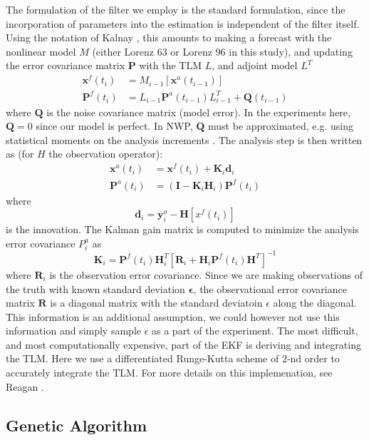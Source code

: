 \documentclass[onecolumn]{article}
\begin{document}
\begin{multicols}{2}
The formulation of the filter we employ is the standard formulation, since the incorporation of parameters into the estimation is independent of the filter itself.
Using the notation of Kalnay \cite{kalnay2003}, this amounts to making a forecast with the nonlinear model $M$ (either Lorenz 63 or Lorenz 96 in this study), and updating the error covariance matrix $\mathbf{P}$ with the TLM $L$, and adjoint model $L^T$
\begin{align*} \mathbf{x}^f (t_i) &= M _{i-1} [\mathbf{x} ^a (t_{i-1} ) ]\\
\mathbf{P}^f (t_i ) &= L_{i-1} \mathbf{P}^a (t_{i-1} ) L^T _{i-1} + \mathbf{Q} (t_{i-1} ) \end{align*}
where $\mathbf{Q}$ is the noise covariance matrix (model error).
In the experiments here, $\mathbf{Q} = 0$ since our model is perfect.
In NWP, $\mathbf{Q}$ must be approximated, e.g. using statistical moments on the analysis increments \cite{danforth2007estimating,li2009accounting}.
The analysis step is then written as (for $H$ the observation operator):
\begin{align} \mathbf{x}^a (t_i ) &= \mathbf{x}^f (t_i) + \mathbf{K}_i \mathbf{d}_i\\
\mathbf{P}^a (t_i) &= (\mathbf{I} - \mathbf{K}_i \mathbf{H}_i )\mathbf{P}^f (t_i) \end{align}
where
\[ \mathbf{d}_i = \mathbf{y}_i^o - \mathbf{H}[x^f (t_i) ] \]
is the innovation. The Kalman gain matrix is computed to minimize the analysis error covariance $P^a _i$ as
\[ \mathbf{K}_i = \mathbf{P}^f (t_i) \mathbf{H}_i ^T [ \mathbf{R}_i + \mathbf{H}_i \mathbf{P}^f (t_i) \mathbf{H}^T ] ^{-1} \]
where $\mathbf{R}_i$ is the observation error covariance.
Since we are making observations of the truth with known standard deviation $\mathbf{\epsilon}$, the observational error covariance matrix $\mathbf{R}$ is a diagonal matrix with the standard deviatoin $\epsilon$ along the diagonal.
This information is an additional assumption, we could however not use this information and simply sample $\epsilon$ as a part of the experiment.
The most difficult, and most computationally expensive, part of the EKF is deriving and integrating the TLM.
Here we use a differentiated Runge-Kutta scheme of 2-nd order to accurately integrate the TLM.
For more details on this implemenation, see Reagan \cite{reagan2013}.

	
\subsection{Genetic Algorithm}


\end{multicols}
\end{document}
